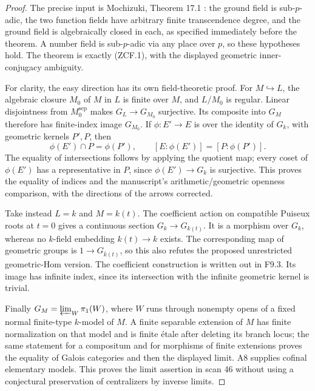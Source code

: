 \begin{proof}
The precise input is Mochizuki, Theorem 17.1
\cite{CF_Mochizuki1999}: the ground field is sub-$p$-adic, the two
function fields have arbitrary finite transcendence degree, and the
ground field is algebraically closed in each, as specified immediately
before the theorem. A number field is sub-$p$-adic via any place over
$p$, so these hypotheses hold. The theorem is exactly (ZCF.1), with
the displayed geometric inner-conjugacy ambiguity.

For clarity, the easy direction has its own field-theoretic proof.
For $M\hookrightarrow L$, the algebraic closure $M_0$ of $M$ in $L$
is finite over $M$, and $L/M_0$ is regular. Linear disjointness from
$M_0^{\mathrm{sep}}$ makes $G_L\to G_{M_0}$ surjective. Its composite
into $G_M$ therefore has finite-index image $G_{M_0}$.
If $\phi:E'\to E$ is over the identity of $G_k$, with geometric
kernels $P',P$, then
\[
 \phi(E')\cap P=\phi(P'),\qquad
 [E:\phi(E')]=[P:\phi(P')].
\]
The equality of intersections follows by applying the quotient map;
every coset of $\phi(E')$ has a representative in $P$, since
$\phi(E')\to G_k$ is surjective. This proves the equality of indices
and the manuscript's arithmetic/geometric openness comparison, with
the directions of the arrows corrected.

Take instead $L=k$ and $M=k(t)$. The coefficient action on compatible
Puiseux roots at $t=0$ gives a continuous section $G_k\to G_{k(t)}$.
It is a morphism over $G_k$, whereas no $k$-field embedding
$k(t)\to k$ exists. The corresponding map of geometric groups is
$1\to G_{\bar k(t)}$, so this also refutes the proposed unrestricted
geometric-Hom version. The coefficient construction is written out in
F9.3. Its image has infinite index, since its intersection with the
infinite geometric kernel is trivial.

Finally $G_M=\varprojlim_W\pi_1(W)$, where $W$ runs through nonempty
opens of a fixed normal finite-type $k$-model of $M$. A finite separable
extension of $M$ has finite normalization on that model and is finite
\'etale after deleting its branch locus; the same statement for a
compositum and for morphisms of finite extensions proves the equality
of Galois categories and then the displayed limit. A8 supplies cofinal
elementary models. This proves the limit assertion in scan 46 without
using a conjectural preservation of centralizers by inverse limits.
\end{proof}

